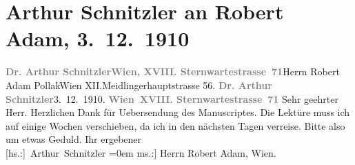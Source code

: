 

         
         \newcommand{\erwaehntePersonen}{Personen: Robert Adam}
         \newcommand{\erwaehnteOrte}{Orte: IX., Alsergrund, Meidlinger Hauptstraße, Sternwartestraße, Wien, XII., Meidling}
         \newcommand{\erwaehnteWerke}{Werke: Neidhard}
               \section[Arthur Schnitzler an Robert Adam, 3. 12. 1910]{ Arthur Schnitzler an Robert Adam, 3. 12. 1910}\nopagebreak{}\rehead{ }\begin{ledgroupsized}[t]{13cm}\normalsize\beginnumbering \toendnotes[C]{\smallbreak\pagebreak[2]} 
\toendnotes[C]{\smallbreak}\pstart{}{\pb}\textcolor{gray}{\textbf{Dr. Arthur Schnitzler}}\pend{}\pstart{}\textcolor{gray}{\textbf{Wien, XVIII. Sternwartestrasse 71}}\pend{}{\bigskip}\pstart{}{\pb}Herrn Robert Adam
                        Pollak\pend{}\pstart{}Wien XII.\pend{}\pstart{}Meidlingerhauptstrasse 56.\pend{}{\bigskip}\pstart
           {\pb}\textcolor{gray}{\textbf{Dr. Arthur Schnitzler}}\hfill 3. 12. 1910.\pend
           \pstart
           \textcolor{gray}{\textbf{Wien XVIII. Sternwartestrasse 71}}\pend
           \pstart\center{}Sehr geehrter Herr.\pend\pstart
           Herzlichen Dank für Uebersendung des Manuscriptes. Die Lektüre muss ich auf einige Wochen
                    verschieben, da ich in den nächsten Tagen verreise. Bitte also um etwas
                    Geduld.\pend
           \pstart
           Ihr ergebener{\\[\baselineskip]}\spacefill\mbox{{[}hs.:{]} Arthur Schnitzler}\pend
           \leftskip=0em{}\pstart
           \noindent{}{[}ms.:{]} Herrn Robert Adam, Wien.\pend
           
         
         \endnumbering{}\end{ledgroupsized}  \newcommand{\dateiname}{L01990}\newcommand{\titel}{Arthur Schnitzler an Robert Adam, 3. 12. 1910}\newcommand{\editorInnen}{Martin Anton Müller und Gerd-Hermann Susen}
      